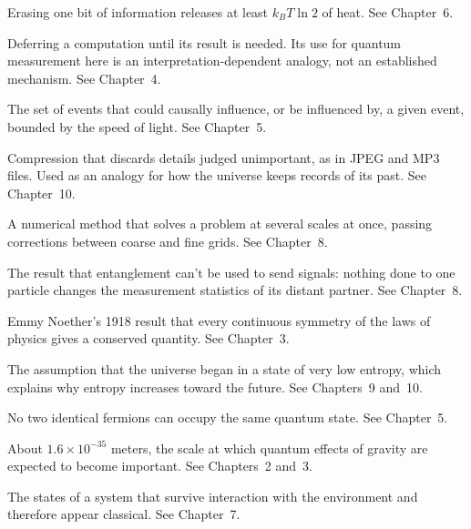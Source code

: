 \begin{description}[
    style=nextline,
    leftmargin=2.2em,
    labelwidth=2em,
    labelsep=0.4em,
    itemsep=0.65em,
    parsep=0pt,
    topsep=0.25em
]
\item[Landauer's principle] Erasing one bit of information releases at least \(k_B T \ln 2\) of heat. See Chapter~6.

\item[Lazy evaluation] Deferring a computation until its result is needed. Its use for quantum measurement here is an interpretation-dependent analogy, not an established mechanism. See Chapter~4.

\item[Light cone] The set of events that could causally influence, or be influenced by, a given event, bounded by the speed of light. See Chapter~5.

\item[Lossy compression] Compression that discards details judged unimportant, as in JPEG and MP3 files. Used as an analogy for how the universe keeps records of its past. See Chapter~10.

\item[Multigrid] A numerical method that solves a problem at several scales at once, passing corrections between coarse and fine grids. See Chapter~8.

\item[No-communication theorem] The result that entanglement can't be used to send signals: nothing done to one particle changes the measurement statistics of its distant partner. See Chapter~8.

\item[Noether's theorem] Emmy Noether's 1918 result that every continuous symmetry of the laws of physics gives a conserved quantity. See Chapter~3.

\item[Past Hypothesis] The assumption that the universe began in a state of very low entropy, which explains why entropy increases toward the future. See Chapters~9 and~10.

\item[Pauli exclusion principle] No two identical fermions can occupy the same quantum state. See Chapter~5.

\item[Planck length] About \(1.6 \times 10^{-35}\) meters, the scale at which quantum effects of gravity are expected to become important. See Chapters~2 and~3.

\item[Pointer states] The states of a system that survive interaction with the environment and therefore appear classical. See Chapter~7.


\end{description}
